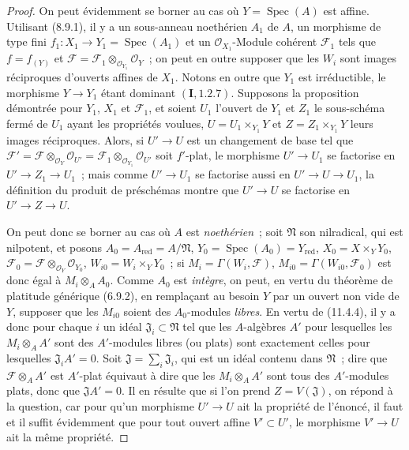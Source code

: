 \begin{proof}
On peut évidemment se borner au cas où $Y=\operatorname{Spec}(A)$ est affine.
Utilisant (8.9.1), il y a un sous-anneau noethérien $A_1$ de $A$, un morphisme
de type fini $f_1:X_1\to Y_1=\operatorname{Spec}(A_1)$ et un
$\mathcal O_{X_1}$-Module cohérent $\mathcal F_1$ tels que $f=f_{(Y)}$ et
$\mathcal F=\mathcal F_1\otimes_{\mathcal O_{Y_1}}\mathcal O_Y$~; on peut en
outre supposer que les $W_i$ sont images réciproques d'ouverts affines de
$X_1$. Notons en outre que $Y_1$ est irréductible, le morphisme $Y\to Y_1$
étant dominant $(\mathbf I,1.2.7)$. Supposons la proposition démontrée pour
$Y_1$, $X_1$ et $\mathcal F_1$, et soient $U_1$ l'ouvert de $Y_1$ et $Z_1$ le
sous-schéma fermé de $U_1$ ayant les propriétés voulues, $U=U_1\times_{Y_1}Y$
et $Z=Z_1\times_{Y_1}Y$ leurs images réciproques. Alors, si $U'\to U$ est un
changement de base tel que
$\mathcal F'=\mathcal F\otimes_{\mathcal O_Y}\mathcal O_{U'}
=\mathcal F_1\otimes_{\mathcal O_{Y_1}}\mathcal O_{U'}$ soit $f'$-plat, le
morphisme $U'\to U_1$ se factorise en $U'\to Z_1\to U_1$~; mais comme
$U'\to U_1$ se factorise aussi en $U'\to U\to U_1$, la définition du produit
de préschémas montre que $U'\to U$ se factorise en $U'\to Z\to U$.

On peut donc se borner au cas où $A$ est \emph{noethérien}~; soit
$\mathfrak N$ son nilradical, qui est nilpotent, et posons
$A_0=A_{\mathrm{red}}=A/\mathfrak N$,
$Y_0=\operatorname{Spec}(A_0)=Y_{\mathrm{red}}$,
$X_0=X\times_YY_0$, $\mathcal F_0=\mathcal F\otimes_{\mathcal O_Y}
\mathcal O_{Y_0}$, $W_{i0}=W_i\times_YY_0$~; si
$M_i=\Gamma(W_i,\mathcal F)$, $M_{i0}=\Gamma(W_{i0},\mathcal F_0)$ est donc
égal à $M_i\otimes_A A_0$. Comme $A_0$ est \emph{intègre}, on peut, en vertu du
théorème de platitude générique (6.9.2), en remplaçant au besoin $Y$ par un
ouvert non vide de $Y$, supposer que les $M_{i0}$ soient des $A_0$-modules
\emph{libres}. En vertu de (11.4.4), il y a donc pour chaque $i$ un idéal
$\mathfrak J_i\subset\mathfrak N$ tel
que les $A$-algèbres $A'$ pour lesquelles les $M_i\otimes_A A'$ sont des
$A'$-modules libres (ou plats) sont exactement celles pour lesquelles
$\mathfrak J_iA'=0$. Soit $\mathfrak J=\sum_i\mathfrak J_i$, qui est un idéal
contenu dans $\mathfrak N$~; dire que $\mathcal F\otimes_A A'$ est $A'$-plat
équivaut à dire que les $M_i\otimes_A A'$ sont tous des $A'$-modules plats,
donc que $\mathfrak JA'=0$. Il en résulte que si l'on prend
$Z=V(\mathfrak J)$, on répond à la question, car pour qu'un morphisme
$U'\to U$ ait la propriété de l'énoncé, il faut et il suffit évidemment que
pour tout ouvert affine $V'\subset U'$, le morphisme $V'\to U$ ait la même
propriété.
\end{proof}

